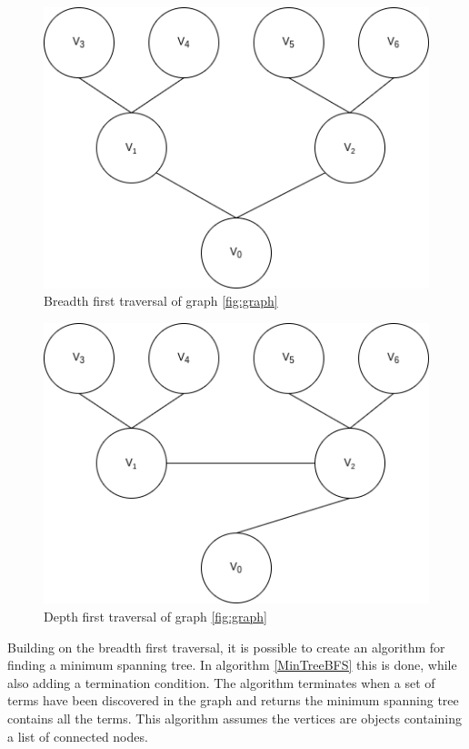 \begin{figure}
    \centering
    \includegraphics[scale=0.5]{figs/BFT.png}
    \caption{Breadth first traversal of graph \ref{fig:graph}}
    \label{fig:BFT}
\end{figure}

\begin{figure}
    \centering
    \includegraphics[scale=0.5]{figs/DFT.png}
    \caption{Depth first traversal of graph \ref{fig:graph}}
    \label{fig:DFT}
\end{figure}

Building on the breadth first traversal, it is possible to create an algorithm for finding a minimum spanning tree. In algorithm \ref{MinTreeBFS} this is done, while also adding a termination condition. The algorithm terminates when a set of terms have been discovered in the graph and returns the minimum spanning tree contains all the terms. This algorithm assumes the vertices are objects containing a list of connected nodes.

